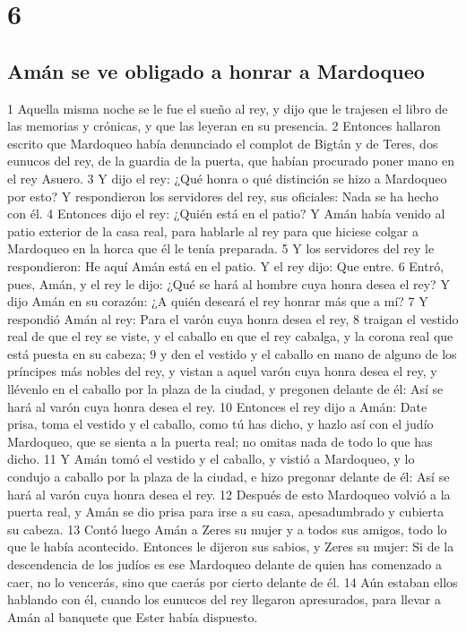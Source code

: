 \chapter{6}

\section*{Amán se ve obligado a honrar a Mardoqueo}

1 Aquella misma noche se le fue el sueño al rey, y dijo que le trajesen el libro de las memorias y crónicas, y que las leyeran en su presencia.
2 Entonces hallaron escrito que Mardoqueo había denunciado el complot de Bigtán y de Teres, dos eunucos del rey, de la guardia de la puerta, que habían procurado poner mano en el rey Asuero. 
3 Y dijo el rey: ¿Qué honra o qué distinción se hizo a Mardoqueo por esto? Y respondieron los servidores del rey, sus oficiales: Nada se ha hecho con él.
4 Entonces dijo el rey: ¿Quién está en el patio? Y Amán había venido al patio exterior de la casa real, para hablarle al rey para que hiciese colgar a Mardoqueo en la horca que él le tenía preparada.
5 Y los servidores del rey le respondieron: He aquí Amán está en el patio. Y el rey dijo: Que entre.
6 Entró, pues, Amán, y el rey le dijo: ¿Qué se hará al hombre cuya honra desea el rey? Y dijo Amán en su corazón: ¿A quién deseará el rey honrar más que a mí?
7 Y respondió Amán al rey: Para el varón cuya honra desea el rey,
8 traigan el vestido real de que el rey se viste, y el caballo en que el rey cabalga, y la corona real que está puesta en su cabeza;
9 y den el vestido y el caballo en mano de alguno de los príncipes más nobles del rey, y vistan a aquel varón cuya honra desea el rey, y llévenlo en el caballo por la plaza de la ciudad, y pregonen delante de él: Así se hará al varón cuya honra desea el rey.
10 Entonces el rey dijo a Amán: Date prisa, toma el vestido y el caballo, como tú has dicho, y hazlo así con el judío Mardoqueo, que se sienta a la puerta real; no omitas nada de todo lo que has dicho.
11 Y Amán tomó el vestido y el caballo, y vistió a Mardoqueo, y lo condujo a caballo por la plaza de la ciudad, e hizo pregonar delante de él: Así se hará al varón cuya honra desea el rey.
12 Después de esto Mardoqueo volvió a la puerta real, y Amán se dio prisa para irse a su casa, apesadumbrado y cubierta su cabeza.
13 Contó luego Amán a Zeres su mujer y a todos sus amigos, todo lo que le había acontecido. Entonces le dijeron sus sabios, y Zeres su mujer: Si de la descendencia de los judíos es ese Mardoqueo delante de quien has comenzado a caer, no lo vencerás, sino que caerás por cierto delante de él.
14 Aún estaban ellos hablando con él, cuando los eunucos del rey llegaron apresurados, para llevar a Amán al banquete que Ester había dispuesto.

